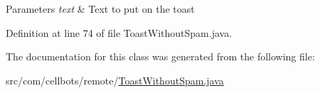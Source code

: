 \begin{DoxyParams}{Parameters}
{\em text} & Text to put on the toast \\
\hline
\end{DoxyParams}


Definition at line 74 of file Toast\-Without\-Spam.\-java.



The documentation for this class was generated from the following file\-:\begin{DoxyCompactItemize}
\item 
src/com/cellbots/remote/\hyperlink{_toast_without_spam_8java}{Toast\-Without\-Spam.\-java}\end{DoxyCompactItemize}
